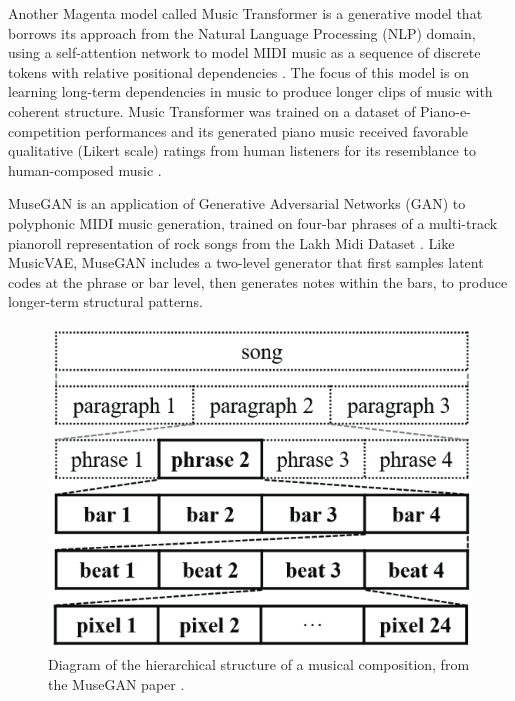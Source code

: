 \documentclass[sigconf,authorversion]{acmart}
\begin{document}
Another Magenta model called Music Transformer is a generative model
that borrows its approach from the Natural Language Processing (NLP)
domain, using a self-attention network to model MIDI music as a
sequence of discrete tokens with relative positional dependencies
\cite{huang_music_2018}. The focus of this model is on learning
long-term dependencies in music to produce longer clips of music with
coherent structure. Music Transformer was trained on a dataset of
Piano-e-competition performances \cite{hawthorne2019enabling} and its
generated piano music received favorable qualitative (Likert scale)
ratings from human listeners for its resemblance to human-composed
music \cite{huang_music_2018}.

MuseGAN \cite{dong2017musegan} is an application of Generative
Adversarial Networks (GAN) to polyphonic MIDI music generation,
trained on four-bar phrases of a multi-track pianoroll representation
of rock songs from the Lakh Midi Dataset
\cite{raffel_learning-based_2016}. Like MusicVAE, MuseGAN includes a
two-level generator that first samples latent codes at the phrase or
bar level, then generates notes within the bars, to produce
longer-term structural patterns.

\begin{figure}[h]
  \centering
  \includegraphics[width=\linewidth]{song_structure.png}
  \caption{Diagram of the hierarchical structure of a musical
    composition, from the MuseGAN paper \cite{dong2017musegan}.}
  \label{song_structure}
\end{figure}
\end{document}
